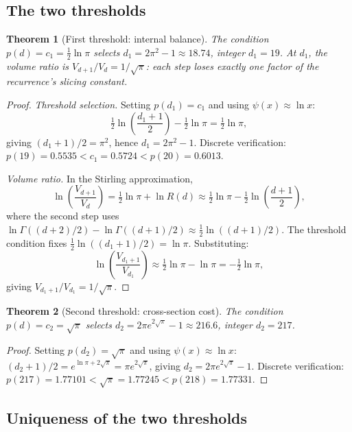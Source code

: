 \documentclass[11pt,a4paper]{article}
\newtheorem{theorem}{Theorem}[section]
\begin{document}
\subsection{The two thresholds}

\begin{theorem}[First threshold: internal balance]
The condition $p(d) = c_1 = \frac{1}{2}\ln\pi$ selects $d_1 = 2\pi^2-1\approx 18.74$, integer $d_1 = 19$. At $d_1$, the volume ratio is $V_{d+1}/V_d = 1/\sqrt{\pi}$: each step loses exactly one factor of the recurrence's slicing constant.
\end{theorem}

\begin{proof}
\textit{Threshold selection.} Setting $p(d_1) = c_1$ and using $\psi(x)\approx\ln x$:
\[
\tfrac{1}{2}\ln\!\left(\frac{d_1+1}{2}\right) - \tfrac{1}{2}\ln\pi = \tfrac{1}{2}\ln\pi,
\]
giving $(d_1+1)/2 = \pi^2$, hence $d_1 = 2\pi^2-1$. Discrete verification: $p(19) = 0.5535 < c_1 = 0.5724 < p(20) = 0.6013$.

\textit{Volume ratio.} In the Stirling approximation,
\[
\ln\!\left(\frac{V_{d+1}}{V_d}\right) = \tfrac{1}{2}\ln\pi + \ln R(d) \approx \tfrac{1}{2}\ln\pi - \tfrac{1}{2}\ln\!\left(\frac{d+1}{2}\right),
\]
where the second step uses $\ln\Gamma((d+2)/2) - \ln\Gamma((d+1)/2)\approx\tfrac{1}{2}\ln((d+1)/2)$. The threshold condition fixes $\tfrac{1}{2}\ln((d_1+1)/2) = \ln\pi$. Substituting:
\[
\ln\!\left(\frac{V_{d_1+1}}{V_{d_1}}\right) \approx \tfrac{1}{2}\ln\pi - \ln\pi = -\tfrac{1}{2}\ln\pi,
\]
giving $V_{d_1+1}/V_{d_1} = 1/\sqrt{\pi}$.
\end{proof}

\begin{theorem}[Second threshold: cross-section cost]
The condition $p(d) = c_2 = \sqrt{\pi}$ selects $d_2 = 2\pi e^{2\sqrt{\pi}}-1\approx 216.6$, integer $d_2 = 217$.
\end{theorem}

\begin{proof}
Setting $p(d_2) = \sqrt{\pi}$ and using $\psi(x)\approx\ln x$: $(d_2+1)/2 = e^{\ln\pi + 2\sqrt{\pi}} = \pi e^{2\sqrt{\pi}}$, giving $d_2 = 2\pi e^{2\sqrt{\pi}}-1$. Discrete verification: $p(217) = 1.77101 < \sqrt{\pi} = 1.77245 < p(218) = 1.77331$.
\end{proof}

\subsection{Uniqueness of the two thresholds}
\end{document}

